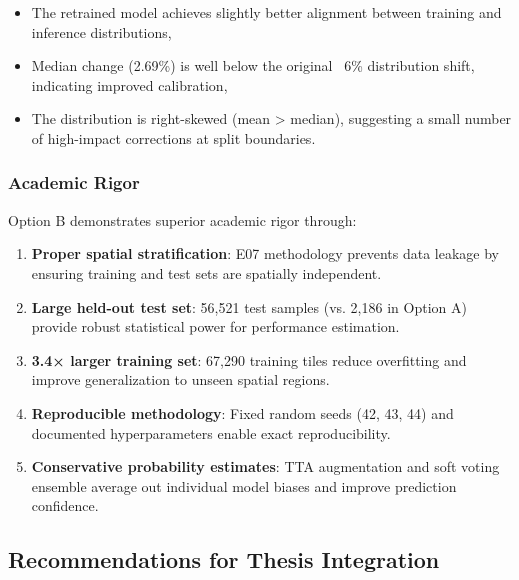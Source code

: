 \begin{itemize}
    \item The retrained model achieves slightly better alignment between training and inference
          distributions,
    \item Median change (2.69\%) is well below the original ~6\% distribution shift, indicating
          improved calibration,
    \item The distribution is right-skewed (mean > median), suggesting a small number of
          high-impact corrections at split boundaries.
\end{itemize}

\subsubsection{Academic Rigor}

Option B demonstrates superior academic rigor through:

\begin{enumerate}
    \item \textbf{Proper spatial stratification}: E07 methodology prevents data leakage by
          ensuring training and test sets are spatially independent.

    \item \textbf{Large held-out test set}: 56,521 test samples (vs. 2,186 in Option A)
          provide robust statistical power for performance estimation.

    \item \textbf{3.4× larger training set}: 67,290 training tiles reduce overfitting and
          improve generalization to unseen spatial regions.

    \item \textbf{Reproducible methodology}: Fixed random seeds (42, 43, 44) and documented
          hyperparameters enable exact reproducibility.

    \item \textbf{Conservative probability estimates}: TTA augmentation and soft voting ensemble
          average out individual model biases and improve prediction confidence.
\end{enumerate}

\subsection{Recommendations for Thesis Integration}

